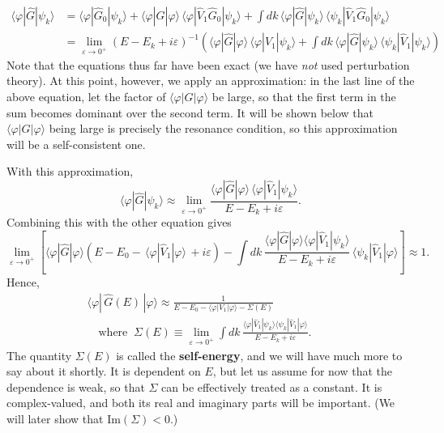 \documentclass[pra,12pt]{revtex4}
\begin{document}
$$\begin{aligned}
\langle\varphi|\hat{G}|\psi_k\rangle &= \langle\varphi|\hat{G}_0|\psi_k\rangle + \langle\varphi|\hat{G}|\varphi\rangle \, \langle\varphi|\hat{V}_1 \hat{G}_0|\psi_k\rangle + \int dk\, \langle\varphi|\hat{G}|\psi_k\rangle \, \langle\psi_k| \hat{V}_1 \hat{G}_0|\psi_k\rangle \\
&= \lim_{\varepsilon\rightarrow0^+} \left(E-E_k+i\varepsilon\right)^{-1} \left(\langle\varphi|\hat{G}|\varphi\rangle \, \langle\varphi|\hat{V}_1|\psi_k\rangle + \int dk\, \langle\varphi|\hat{G}|\psi_k\rangle \, \langle\psi_k| \hat{V}_1|\psi_k\rangle\right)\end{aligned}$$
Note that the equations thus far have been exact (we have \textit{not}
used perturbation theory).  At this point, however, we apply an
approximation: in the last line of the above equation, let the factor
of $\langle\varphi|G|\varphi\rangle$ be large, so that the first term
in the sum becomes dominant over the second term.  It will be shown
below that $\langle\varphi|G|\varphi\rangle$ being large is precisely
the resonance condition, so this approximation will be a
self-consistent one.

With this approximation,
$$\langle\varphi|\hat{G}|\psi_k\rangle \approx \lim_{\varepsilon\rightarrow0^+} \frac{\langle\varphi|\hat{G}|\varphi\rangle \, \langle\varphi|\hat{V}_1|\psi_k\rangle}{E-E_k+i\varepsilon}.$$
Combining this with the other equation gives
$$\lim_{\varepsilon\rightarrow0^+} \left[\langle\varphi|\hat{G}|\varphi\rangle \left(E - E_0 -\, \langle\varphi|\hat{V}_1|\varphi\rangle \, + i\varepsilon\right) - \int dk\, \frac{\langle\varphi|\hat{G}|\varphi\rangle\langle\varphi|\hat{V}_1|\psi_k\rangle}{E-E_k+i\varepsilon} \, \langle\psi_k| \hat{V}_1|\varphi\rangle\right] \approx 1.$$
Hence,
$$\boxed{\begin{aligned}\langle\varphi|\,\hat{G}(E)\,|\varphi\rangle \approx \frac{1}{\displaystyle E - E_0 - \langle\varphi|V_1|\varphi\rangle - \Sigma(E)} \qquad \\ \quad \mathrm{where}\;\;\Sigma(E) \equiv \lim_{\varepsilon\rightarrow0^+} \int dk\, \frac{\displaystyle\langle\varphi|\hat{V}_1|\psi_k\rangle \langle\psi_k| \hat{V}_1|\varphi\rangle}{\displaystyle E-E_k+i\varepsilon}. \qquad
\end{aligned}}$$
The quantity $\Sigma(E)$ is called the \textbf{self-energy}, and we
will have much more to say about it shortly.  It is dependent on $E$,
but let us assume for now that the dependence is weak, so that
$\Sigma$ can be effectively treated as a constant.  It is
complex-valued, and both its real and imaginary parts will be
important.  (We will later show that $\mathrm{Im}(\Sigma) < 0$.)
\end{document}
